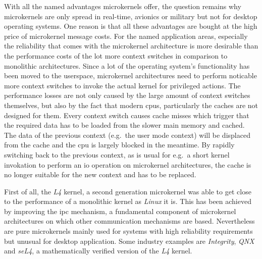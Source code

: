 With all the named advantages microkernels offer, the question remains why microkernels are only spread in real-time, avionics or military but not for desktop operating systems.
One reason is that all these advantages are bought at the high price of microkernel message costs.
For the named application areas, especially the reliability that comes with the microkernel architecture is more desirable than the performance costs of the lot more context switches in comparison to monolithic architectures\cite{tanenbaum-modern-operating-systems}.
Since a lot of the operating system's functionality has been moved to the userspace, microkernel architectures need to perform noticable more context switches to invoke the actual kernel for privileged actions. 
The performance losses are not only caused by the large amount of context switches themselves, but also by the fact that modern \acp{cpu}, particularly the caches are not designed for them. 
Every context switch causes cache misses which trigger that the required data has to be loaded from the slower main memory and cached. 
The data of the previous context (e.g.\ the user mode context) will be displaced from the cache and the \ac{cpu} is largely blocked in the meantime.
By rapidly switching back to the previous context, as is usual for e.g.\ a short kernel invokation to perform an \ac{io} operation on microkernel architectures, the cache is no longer suitable for the new context and has to be replaced\cite{lfd430}.

First of all, the \textit{L4} kernel, a second generation microkernel was able to get close to the performance of a monolithic kernel as \textit{Linux} it is\cite{Hrtig1997}.   
This has been achieved by improving the \acf{ipc} mechanism, a fundamental component of microkernel architectures on which other communication mechanisms are based.
Nevertheless are pure microkernels mainly used for systems with high reliability requirements but unusual for desktop application. 
Some industry examples are \textit{Integrity}, \textit{QNX} and \textit{seL4}, a mathematically verified version of the \textit{L4} kernel\cite{tanenbaum-modern-operating-systems}. 



